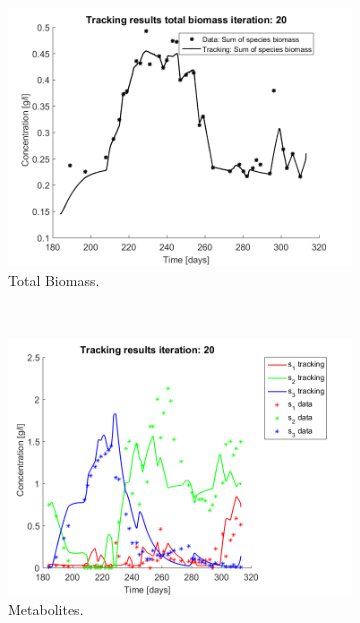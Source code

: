 \documentclass[processes,article,submit,moreauthors,pdftex]{Definitions/mdpi}
\begin{document}
\begin{figure}[h]
	\centering
	\begin{subfigure}{0.45 \linewidth}
		\includegraphics[width= \textwidth]{Application/200407_regroup_OTU_try2_iter_20_Biomass}
		\caption{Total Biomass.}
		\label{Total Biomass application}
	\end{subfigure}
	~
	\begin{subfigure}{0.45 \linewidth}
		\includegraphics[width=\textwidth]{Application/200407_regroup_OTU_try2_iter_20_metabolites}
		\caption{Metabolites.}
		\label{Metabolites application}
	\end{subfigure}
	\begin{subfigure}{0.45 \linewidth}

\end{subfigure}
\end{figure}
\end{document}
